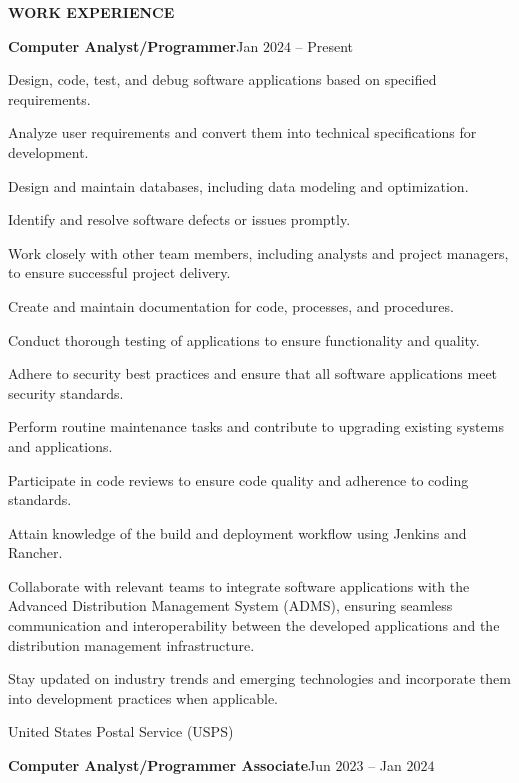 \documentclass[a4paper, 12pt]{article}
\begin{document}
\newpage
\begin{flushleft}
\faSuitcase\quad\textbf{WORK EXPERIENCE}
\begin{flushleft}
    \textbf{Computer Analyst/Programmer}\hfill Jan $2024$ -- Present
    \begin{compactitem}
        \item Design, code, test, and debug software applications based on specified requirements.
        \item Analyze user requirements and convert them into technical specifications for development.
        \item Design and maintain databases, including data modeling and optimization.
        \item Identify and resolve software defects or issues promptly.
        \item Work closely with other team members, including analysts and project managers, to ensure successful project delivery.
        \item Create and maintain documentation for code, processes, and procedures.
        \item Conduct thorough testing of applications to ensure functionality and quality.
        \item Adhere to security best practices and ensure that all software applications meet security standards.
        \item Perform routine maintenance tasks and contribute to upgrading existing systems and applications.
        \item Participate in code reviews to ensure code quality and adherence to coding standards.
        \item Attain knowledge of the build and deployment workflow using Jenkins and Rancher.
        \item Collaborate with relevant teams to integrate software applications with the Advanced Distribution Management System (ADMS), ensuring seamless communication and interoperability between the developed applications and the distribution management infrastructure. 
        \item Stay updated on industry trends and emerging technologies and incorporate them into development practices when applicable.
    \end{compactitem}
    United States Postal Service (USPS)
\end{flushleft}
\begin{flushleft}
\textbf{Computer Analyst/Programmer Associate}\hfill Jun $2023$ -- Jan $2024$\\

\end{flushleft}
\end{flushleft}
\end{document}
